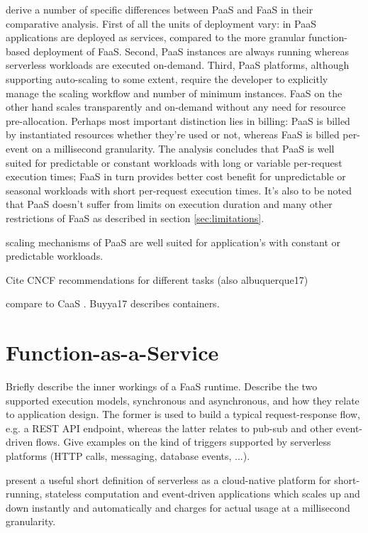 \documentclass[utf8,english]{gradu3}
\begin{document}
\textcite{albuquerque17faaspaas} derive a number of specific differences between PaaS and FaaS in their comparative analysis. First of all the units of deployment vary: in PaaS applications are deployed as services, compared to the more granular function-based deployment of FaaS. Second, PaaS instances are always running whereas serverless workloads are executed on-demand. Third, PaaS platforms, although supporting auto-scaling to some extent, require the developer to explicitly manage the scaling workflow and number of minimum instances. FaaS on the other hand scales transparently and on-demand without any need for resource pre-allocation. Perhaps most important distinction lies in billing: PaaS is billed by instantiated resources whether they're used or not, whereas FaaS is billed per-event on a millisecond granularity. The analysis concludes that PaaS is well suited for predictable or constant workloads with long or variable per-request execution times; FaaS in turn provides better cost benefit for unpredictable or seasonal workloads with short per-request execution times. It's also to be noted that PaaS doesn't suffer from limits on execution duration and many other restrictions of FaaS as described in section \ref{sec:limitations}.

scaling mechanisms of PaaS are well suited for application's with constant or predictable workloads.

Cite CNCF  recommendations for different tasks (also albuquerque17)

compare to CaaS \parencite{cncf18serverlessWG}. Buyya17 describes containers.

\section{Function-as-a-Service} \label{faas}

Briefly describe the inner workings of a FaaS runtime. Describe the two supported execution models, synchronous and asynchronous, and how they relate to application design. The former is used to build a typical request-response flow, e.g. a REST API endpoint, whereas the latter relates to pub-sub and other event-driven flows. Give examples on the kind of triggers supported by serverless platforms (HTTP calls, messaging, database events, ...).

\textcite{fox17} present a useful short definition of serverless as a cloud-native platform for short-running, stateless computation and event-driven applications which scales up and down instantly and automatically and charges for actual usage at a millisecond granularity.
\end{document}
